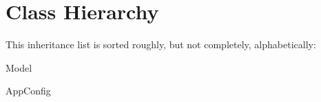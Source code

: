 \section{Class Hierarchy}
This inheritance list is sorted roughly, but not completely, alphabetically\+:\begin{DoxyCompactList}
\item Model\begin{DoxyCompactList}
\item {}
\end{DoxyCompactList}
\item App\+Config\begin{DoxyCompactList}
\item {}
\end{DoxyCompactList}
\end{DoxyCompactList}
